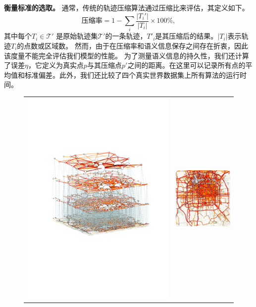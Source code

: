 \vspace{3mm}
\noindent\textbf{衡量标准的选取。} 
通常，传统的轨迹压缩算法通过压缩比来评估，其定义如下。
\begin{equation}
\text{压缩率} = 1- \sum_i\frac{|T_i'|}{|T_i|} \times 100\%,
\label{eq:ratio}
\end{equation}
其中每个$T_i\in\mathcal{T}'$ 是原始轨迹集$\mathcal{T}'$的一条轨迹，$T'_i$是其压缩后的结果。$|T_i|$表示轨迹$T_i$的点数或区域数。 然而，由于在压缩率和语义信息保存之间存在折衷，因此该度量不能完全评估我们模型的性能。 为了测量语义信息的持久性，我们还计算了误差$\eta$，它定义为真实点$p$与其压缩点$p'$之间的距离。在这里可以记录所有点的平均值和标准偏差。此外，我们还比较了四个真实世界数据集上所有算法的运行时间。


\tabcolsep=0pt
\begin{figure}[!htb]
\centering
\begin{tabular}{cc}
{\includegraphics[width=86mm]{pics/withLine3.pdf}} & 
\begin{minipage}[b]{67mm}
\centering
\includegraphics[width=33mm]{pics/geolife200m.eps}

\end{minipage}
\end{tabular}
\end{figure}
